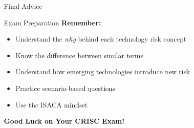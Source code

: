 \documentclass{beamer}
\begin{document}
	\begin{frame}{Final Advice}
		\begin{block}{Exam Preparation}
			\centering
			\vspace{0.3cm}
			\textbf{Remember:}
			\begin{itemize}
				\item Understand the \textit{why} behind each technology risk concept
				\item Know the difference between similar terms
				\item Understand how emerging technologies introduce new risk
				\item Practice scenario-based questions
				\item Use the ISACA mindset
			\end{itemize}
			\vspace{0.5cm}
			\textbf{Good Luck on Your CRISC Exam!}
		\end{block}
	\end{frame}
	
\end{document}
